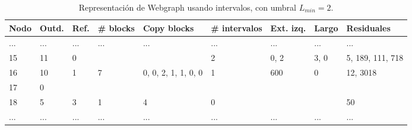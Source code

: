 \begin{table}%
\caption{Representación de Webgraph usando intervalos, con umbral $L_{min} = 2$.}
\label{table:webgraph4}
\centering
\scriptsize

\begin{tabular}{|l|l|l|l|l|l|l|l|l|}
	\toprule
	Nodo & Outd. & Ref. & \# blocks & Copy blocks & \# intervalos & Ext. izq. & Largo & Residuales \\
	\midrule
	... & ... & ... & ... & ... & ...  & ...  & ...  & ... \\
	15 & 11 & 0 &  &  & 2 & 0, 2 & 3, 0 & 5, 189, 111, 718 \\
	16 & 10 & 1 & 7 & 0, 0, 2, 1, 1, 0, 0 & 1 & 600 & 0 & 12, 3018 \\
	17 & 0 &  &  &  &  &  &  & \\
	18 & 5 & 3 & 1 & 4 & 0 &  &  & 50 \\
	... & ... & ... & ... & ... & ...  & ...  & ...  & ... \\
\end{tabular}
\end{table} 
